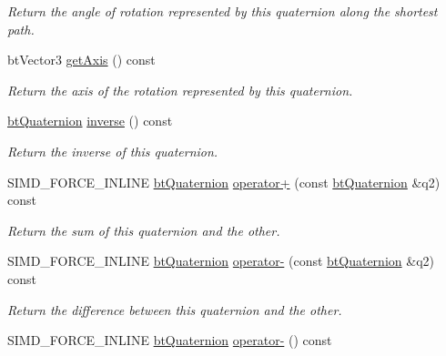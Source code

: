 \begin{DoxyCompactItemize}
\begin{DoxyCompactList}\small\item\em Return the angle of rotation represented by this quaternion along the shortest path. \end{DoxyCompactList}\item 
\mbox{\label{classbtQuaternion_add2fa918491b289939b8a829d3239b00}} 
bt\+Vector3 \hyperlink{classbtQuaternion_add2fa918491b289939b8a829d3239b00}{get\+Axis} () const
\begin{DoxyCompactList}\small\item\em Return the axis of the rotation represented by this quaternion. \end{DoxyCompactList}\item 
\mbox{\label{classbtQuaternion_ab2f4fcf35da5e846ceba91af625062f7}} 
\hyperlink{classbtQuaternion}{bt\+Quaternion} \hyperlink{classbtQuaternion_ab2f4fcf35da5e846ceba91af625062f7}{inverse} () const
\begin{DoxyCompactList}\small\item\em Return the inverse of this quaternion. \end{DoxyCompactList}\item 
S\+I\+M\+D\+\_\+\+F\+O\+R\+C\+E\+\_\+\+I\+N\+L\+I\+NE \hyperlink{classbtQuaternion}{bt\+Quaternion} \hyperlink{classbtQuaternion_a70cace8911befee9f0684391d16985d0}{operator+} (const \hyperlink{classbtQuaternion}{bt\+Quaternion} \&q2) const
\begin{DoxyCompactList}\small\item\em Return the sum of this quaternion and the other. \end{DoxyCompactList}\item 
S\+I\+M\+D\+\_\+\+F\+O\+R\+C\+E\+\_\+\+I\+N\+L\+I\+NE \hyperlink{classbtQuaternion}{bt\+Quaternion} \hyperlink{classbtQuaternion_a2b440e462111b777fd2229446ba4618c}{operator-\/} (const \hyperlink{classbtQuaternion}{bt\+Quaternion} \&q2) const
\begin{DoxyCompactList}\small\item\em Return the difference between this quaternion and the other. \end{DoxyCompactList}\item 
\mbox{\label{classbtQuaternion_af3e8f7a6be3e581a2cead40723cf873c}} 
S\+I\+M\+D\+\_\+\+F\+O\+R\+C\+E\+\_\+\+I\+N\+L\+I\+NE \hyperlink{classbtQuaternion}{bt\+Quaternion} \hyperlink{classbtQuaternion_af3e8f7a6be3e581a2cead40723cf873c}{operator-\/} () const

\end{DoxyCompactItemize}
